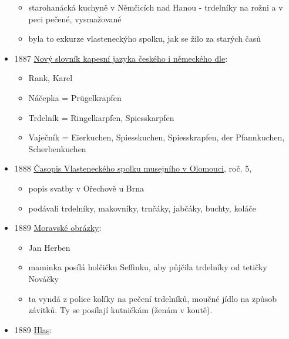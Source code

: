 \begin{itemize}
  \begin{itemize}
  \tightlist
  \item
    starohanácká kuchyně v Němčicích nad Hanou - trdelníky na rožni a v
    peci pečené, vysmažované
  \item
    byla to exkurze vlasteneckýho spolku, jak se žilo za starých časů
  \end{itemize}
\item
  1887
  \href{https://ceskadigitalniknihovna.cz/uuid/uuid:cac319e0-dea6-11e6-9964-005056825209}{Nový
  slovník kapesní jazyka českého i německého dle}:

  \begin{itemize}
  \tightlist
  \item
    Rank, Karel
  \item
    Náčepka = Prügelkrapfen
  \item
    Trdelník = Ringelkarpfen, Spiesskarpfen
  \item
    Vaječník = Eierkuchen, Spiesskuchen, Spiesskrapfen, der Pfannkuchen,
    Scherbenkuchen
  \end{itemize}
\item
  1888
  \href{https://ndk.cz/view/uuid:8d89f8c0-abdb-11dd-ae2a-000d606f5dc6?page=uuid\%3Afbdf17f0-247b-11e9-90cf-5ef3fc9bb22f}{Časopis
  Vlasteneckého spolku musejního v Olomouci}, roč. 5,

  \begin{itemize}
  \tightlist
  \item
    popis svatby v Ořechově u Brna
  \item
    podávali trdelníky, makovníky, trnčáky, jabčáky, buchty, koláče
  \end{itemize}
\item
  1889
  \href{https://ndk.cz/view/uuid:df0f4040-895f-11dd-a7d7-000d606f5dc6?page=uuid\%3A1bb49280-82c0-11e7-94b3-005056825209&fulltext=trdeln\%C3\%ADky}{Moravské
  obrázky}:

  \begin{itemize}
  \tightlist
  \item
    Jan Herben
  \item
    maminka posílá holčičku Seffinku, aby půjčila trdelníky od tetičky
    Nováčky
  \item
    ta vyndá z police kolíky na pečení trdelníků, moučné jídlo na způsob
    závitků. Ty se posílají kutničkám (ženám v koutě).
  \end{itemize}
\item
  1889
  \href{https://www.digitalniknihovna.cz/vkol/uuid/uuid:3a12df2c-c1ab-42a4-a423-5746952a0111}{Hlas}:


\end{itemize}
